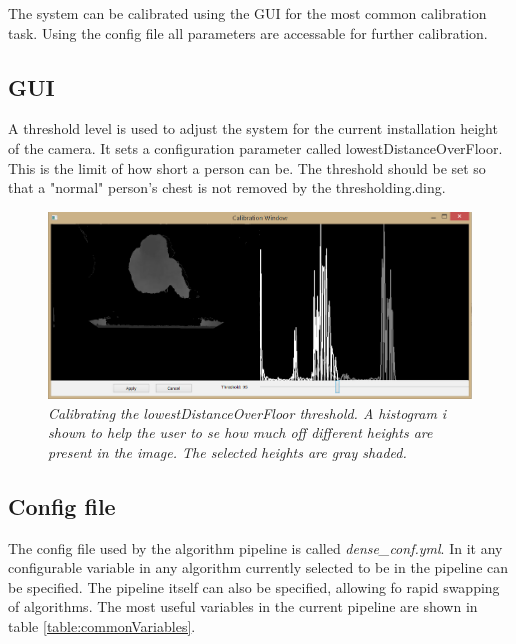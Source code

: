 The system can be calibrated using the GUI for the most common calibration task. Using the config file all parameters are accessable for further calibration.

\subsection{GUI}
A threshold level is used to adjust the system for the current installation height of the camera. It sets a configuration parameter called lowestDistanceOverFloor. This is the limit of how short a person can be. The threshold should be set so that a "normal" person’s chest is not removed by the thresholding.ding.

\begin{figure}[htb]
	\centering
	\includegraphics[width=\linewidth]{images/Calibration.png}
	\caption[Overview of the entire system]{\textit{Calibrating the lowestDistanceOverFloor threshold. A histogram i shown to help the user to se how much off different heights are present in the image. The selected heights are gray shaded.}}
	\label{fig:lowestDistanceOverFloor_calibration}  %
\end{figure}

\newpage
\subsection{Config file}
The config file used by the algorithm pipeline is called \textit{dense\_conf.yml}. In it any configurable variable in any algorithm currently selected to be in the pipeline can be specified. The pipeline itself can also be specified, allowing fo rapid swapping of algorithms. The most useful variables in the current pipeline are shown in table \ref{table:commonVariables}.\\

